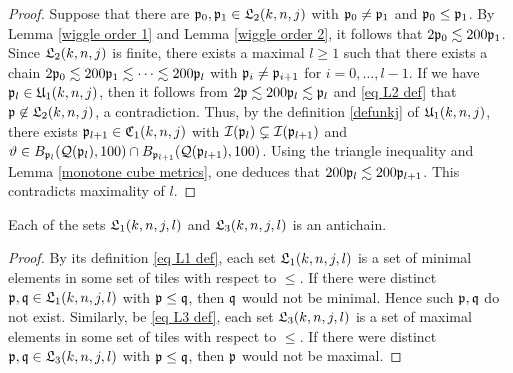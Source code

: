 {\begin{proof}
    Suppose that there are $\mathfrak p_0, \mathfrak p_1 \in \mathfrak L_2(k,n,j)$ with $\mathfrak p_0 \ne \mathfrak p_1$ and $\mathfrak p_0 \le \mathfrak p_1$. By Lemma \ref{wiggle order 1} and Lemma \ref{wiggle order 2}, it follows that $2\mathfrak p_0 \lesssim 200\mathfrak p_1$. Since $\mathfrak L_2(k,n,j)$ is finite, there exists a maximal $l \ge 1$ such that there exists a chain $2\mathfrak p_0 \lesssim 200 \mathfrak p_1 \lesssim \dotsb \lesssim 200 \mathfrak p_l$ with $\mathfrak p_i \ne \mathfrak p_{i+1}$ for $i = 0, \dotsc, l-1$.
    If we have $\mathfrak p_l \in \mathfrak U_1(k,n,j)$, then it follows from $2\mathfrak p \lesssim 200 \mathfrak p_l \lesssim \mathfrak p_l$ and \eqref{eq L2 def} that $\mathfrak p \not\in \mathfrak L_2(k,n,j)$, a contradiction. Thus, by the definition \eqref{defunkj}  of $\mathfrak U_1(k,n,j)$, there exists $\mathfrak p_{l+1} \in \mathfrak C_1(k,n,j)$ with $\mathcal{I}(\mathfrak p_l) \subsetneq \mathcal{I}(\mathfrak p_{l+1}) $ and $\vartheta \in B_{\mathfrak p_l}(\mathcal{Q}(\mathfrak p_l), 100) \cap B_{\mathfrak p_{l+1}}(\mathcal{Q}(\mathfrak p_{l+1}), 100)$. Using the triangle inequality and Lemma \ref{monotone cube metrics}, one deduces that $200 \mathfrak p_l \lesssim 200\mathfrak p_{l+1}$. This contradicts maximality of $l$.
\end{proof}

\begin{lemma}
\label{L1 L3 antichain}
    Each of the sets $\mathfrak L_1(k,n,j,l)$ and $\mathfrak L_3(k,n,j,l)$ is an antichain.
\end{lemma}

\begin{proof}
    By its definition \eqref{eq L1 def}, each set $\mathfrak L_1(k,n,j,l)$ is a set of minimal elements in some set of tiles with respect to $\le$. If there were distinct $\mathfrak p, \mathfrak q \in \mathfrak L_1(k,n,j,l)$ with $\mathfrak p \le \mathfrak q$, then $\mathfrak q$ would not be minimal. Hence such $\mathfrak p, \mathfrak q$ do not exist. Similarly, be \eqref{eq L3 def}, each set $\mathfrak L_3(k,n,j,l)$ is a set of maximal elements in some set of tiles with respect to $\le$. If there were distinct $\mathfrak p, \mathfrak q \in \mathfrak L_3(k,n,j,l)$ with $\mathfrak p \le \mathfrak q$, then $\mathfrak p$ would not be maximal.
\end{proof}

}
